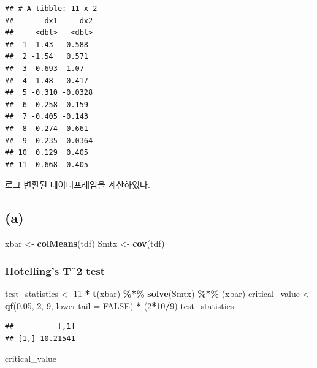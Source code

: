 \documentclass[
]{article}
\newenvironment{Shaded}{\begin{snugshade}}{\end{snugshade}}
\newcommand{\AttributeTok}[1]{\textcolor[rgb]{0.13,0.29,0.53}{#1}}
\newcommand{\ConstantTok}[1]{\textcolor[rgb]{0.56,0.35,0.01}{#1}}
\newcommand{\DecValTok}[1]{\textcolor[rgb]{0.00,0.00,0.81}{#1}}
\newcommand{\FloatTok}[1]{\textcolor[rgb]{0.00,0.00,0.81}{#1}}
\newcommand{\FunctionTok}[1]{\textcolor[rgb]{0.13,0.29,0.53}{\textbf{#1}}}
\newcommand{\NormalTok}[1]{#1}
\newcommand{\OtherTok}[1]{\textcolor[rgb]{0.56,0.35,0.01}{#1}}
\newcommand{\SpecialCharTok}[1]{\textcolor[rgb]{0.81,0.36,0.00}{\textbf{#1}}}
\begin{document}
\begin{verbatim}
## # A tibble: 11 x 2
##       dx1     dx2
##     <dbl>   <dbl>
##  1 -1.43   0.588 
##  2 -1.54   0.571 
##  3 -0.693  1.07  
##  4 -1.48   0.417 
##  5 -0.310 -0.0328
##  6 -0.258  0.159 
##  7 -0.405 -0.143 
##  8  0.274  0.661 
##  9  0.235 -0.0364
## 10  0.129  0.405 
## 11 -0.668 -0.405
\end{verbatim}

로그 변환된 데이터프레임을 계산하였다.

\subsection{(a)}\label{a}

\begin{Shaded}
\begin{Highlighting}[]
\NormalTok{xbar }\OtherTok{\textless{}{-}} \FunctionTok{colMeans}\NormalTok{(tdf)}
\NormalTok{Smtx }\OtherTok{\textless{}{-}} \FunctionTok{cov}\NormalTok{(tdf)}
\end{Highlighting}
\end{Shaded}

\subsubsection{Hotelling's T\^{}2 test}\label{hotellings-t2-test}

\begin{Shaded}
\begin{Highlighting}[]
\NormalTok{test\_statistics }\OtherTok{\textless{}{-}} \DecValTok{11} \SpecialCharTok{*} \FunctionTok{t}\NormalTok{(xbar) }\SpecialCharTok{\%*\%} \FunctionTok{solve}\NormalTok{(Smtx) }\SpecialCharTok{\%*\%}\NormalTok{ (xbar)}
\NormalTok{critical\_value }\OtherTok{\textless{}{-}} \FunctionTok{qf}\NormalTok{(}\FloatTok{0.05}\NormalTok{, }\DecValTok{2}\NormalTok{, }\DecValTok{9}\NormalTok{, }\AttributeTok{lower.tail =} \ConstantTok{FALSE}\NormalTok{) }\SpecialCharTok{*}\NormalTok{ (}\DecValTok{2}\SpecialCharTok{*}\DecValTok{10}\SpecialCharTok{/}\DecValTok{9}\NormalTok{)}
\NormalTok{test\_statistics}
\end{Highlighting}
\end{Shaded}

\begin{verbatim}
##          [,1]
## [1,] 10.21541
\end{verbatim}

\begin{Shaded}
\begin{Highlighting}[]
\NormalTok{critical\_value}
\end{Highlighting}
\end{Shaded}
\end{document}
